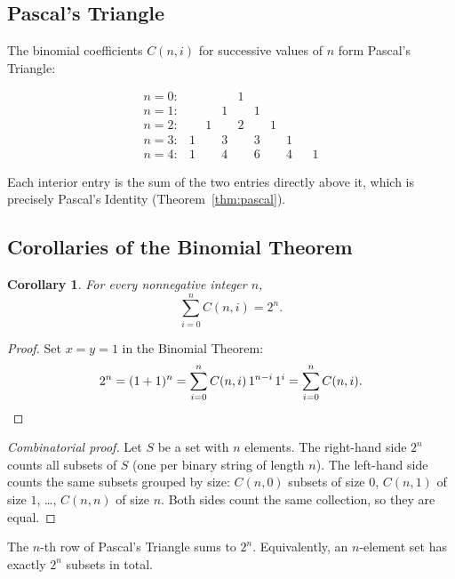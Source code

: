 \documentclass[11pt, a4paper, notitlepage]{report}
\newtheorem{corollary}[theorem]{Corollary}
\theoremstyle{definition}
\theoremstyle{remark}
\begin{document}
\subsection{Pascal's Triangle}

The binomial coefficients $C(n,i)$ for successive values of $n$ form Pascal's Triangle:

\[
\begin{array}{ccccccccc}
  n=0: & & & & 1 \\
  n=1: & & & 1 & & 1 \\
  n=2: & & 1 & & 2 & & 1 \\
  n=3: & 1 & & 3 & & 3 & & 1 \\
  n=4: & 1 & & 4 & & 6 & & 4 & & 1
\end{array}
\]

Each interior entry is the sum of the two entries directly above it, which is precisely
Pascal's Identity (Theorem~\ref{thm:pascal}).

\subsection{Corollaries of the Binomial Theorem}

\begin{corollary}
\label{cor:sum2n}
For every nonnegative integer $n$,
\[
  \sum_{i=0}^{n} C(n,i) = 2^n.
\]
\end{corollary}

\begin{proof}
Set $x = y = 1$ in the Binomial Theorem:
\[
  2^n = (1+1)^n = \sum_{i=0}^{n} C(n,i)\,1^{n-i}\,1^{i} = \sum_{i=0}^{n} C(n,i). \qedhere
\]
\end{proof}

\begin{proof}[Combinatorial proof]
Let $S$ be a set with $n$ elements.  The right-hand side $2^n$ counts all subsets of $S$
(one per binary string of length $n$).  The left-hand side counts the same subsets grouped
by size: $C(n,0)$ subsets of size $0$, $C(n,1)$ of size $1$, \dots, $C(n,n)$ of size $n$.
Both sides count the same collection, so they are equal.
\end{proof}

\begin{keyresult}[title={Key Result: Sum of Binomial Coefficients}]
The $n$-th row of Pascal's Triangle sums to $2^n$.  Equivalently, an $n$-element set has
exactly $2^n$ subsets in total.
\end{keyresult}

\end{document}
